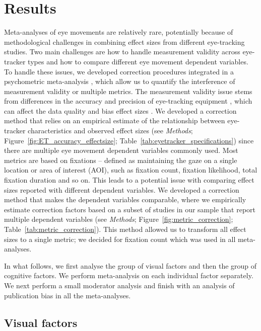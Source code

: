 
\section{Results}

Meta-analyses of eye movements are relatively rare, potentially because of methodological challenges in combining effect sizes from different eye-tracking studies. Two main challenges are how to handle measurement validity across eye-tracker types and how to compare different eye movement dependent variables. To handle these issues, we developed correction procedures integrated in a psychometric meta-analysis \citep{hunter2004a}, which allow us to quantify the interference of measurement validity or multiple metrics. The measurement validity issue stems from differences in the accuracy and precision of eye-tracking equipment \citep{holmqvist2015a}, which can affect the data quality and bias effect sizes \citep{orquin2016a}. We developed a correction method that relies on an empirical estimate of the relationship between eye-tracker characteristics and observed effect sizes (see \textit{Methods}; Figure~\ref{fig:ET_accuracy_effectsize}; Table~\ref{tab:eyetracker_specifications}) since there are multiple eye movement dependent variables commonly used. Most metrics are based on fixations -- defined as maintaining the gaze on a single location or area of interest (AOI), such as fixation count, fixation likelihood, total fixation duration and so on. This leads to a potential issue with comparing effect sizes reported with different dependent variables. We developed a correction method that makes the dependent variables comparable, where we empirically estimate correction factors based on a subset of studies in our sample that report multiple dependent variables (see \textit{Methods}; Figure~\ref{fig:metric_correction}; Table~\ref{tab:metric_correction}). This method allowed us to transform all effect sizes to a single metric; we decided for fixation count which was used in all meta-analyses. 

In what follows, we first analyse the group of visual factors and then the group of cognitive factors. We perform meta-analysis on each individual factor  separately. We next perform a small moderator analysis and finish with an analysis of publication bias in all the meta-analyses.  


\subsection{Visual factors}

